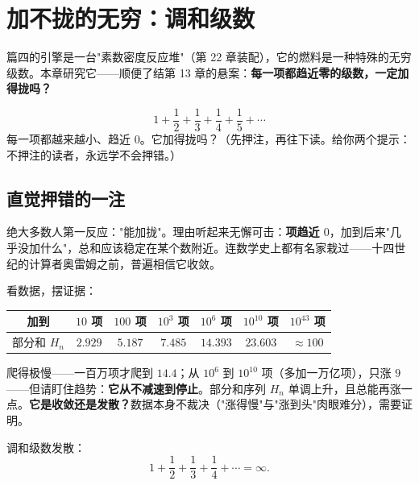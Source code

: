 \chapter{加不拢的无穷：调和级数}

篇四的引擎是一台"素数密度反应堆"（第 22 章装配），它的燃料是一种特殊的无穷级数。本章研究它——顺便了结第 13 章的悬案：\textbf{每一项都趋近零的级数，一定加得拢吗？}

\begin{kaiwei}
\[
1 + \frac12 + \frac13 + \frac14 + \frac15 + \cdots
\]
每一项都越来越小、趋近 $0$。它加得拢吗？（先押注，再往下读。给你两个提示：不押注的读者，永远学不会押错。）
\end{kaiwei}

\section{直觉押错的一注}

绝大多数人第一反应："能加拢"。理由听起来无懈可击：\textbf{项趋近 $0$}，加到后来"几乎没加什么"，总和应该稳定在某个数附近。连数学史上都有名家栽过——十四世纪的计算者奥雷姆之前，普遍相信它收敛。

看数据，摆证据：

\begin{center}
\begin{tabular}{ccccccc}
\toprule
加到 & $10$ 项 & $100$ 项 & $10^3$ 项 & $10^6$ 项 & $10^{10}$ 项 & $10^{43}$ 项 \\
\midrule
部分和 $H_n$ & $2.929$ & $5.187$ & $7.485$ & $14.393$ & $23.603$ & $\approx 100$ \\
\bottomrule
\end{tabular}
\end{center}

爬得极慢——一百万项才爬到 $14.4$；从 $10^6$ 到 $10^{10}$ 项（多加一万亿项），只涨 $9$——但请盯住趋势：\textbf{它从不减速到停止}。部分和序列 $H_n$ 单调上升，且总能再涨一点。\textbf{它是收敛还是发散？}数据本身不裁决（"涨得慢"与"涨到头"肉眼难分），需要证明。

\begin{dingli}[奥雷姆，约 1350 年]
调和级数发散：
\[
1 + \frac12 + \frac13 + \frac14 + \cdots = \infty .
\]
\end{dingli}

